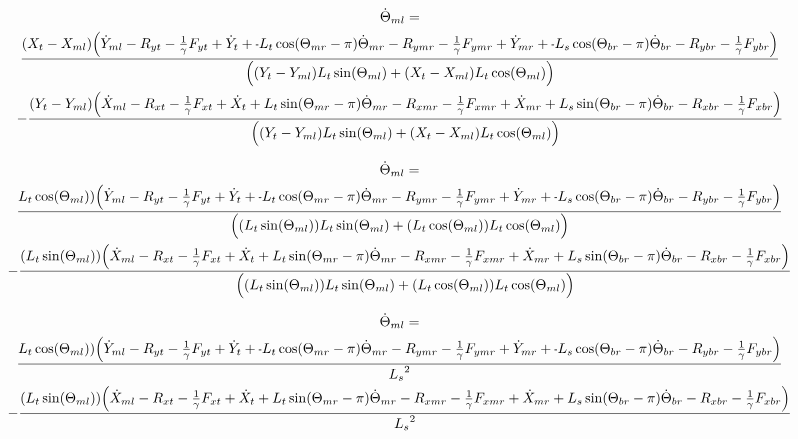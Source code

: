\documentclass[11pt, landscape]{article}
\newcommand{\mn}{\scalebox{0.7}[1.0]{-}}
\begin{document}
\begin{multline}
\dot{\Theta}_{ml} = \\
\frac{(X_{t } - X_{ml}) \Big( \dot{Y}_{ml} - R_{yt} - \frac{1}{\gamma}F_{yt } + \dot{Y}_{t } + \mn L_{t}\cos(\Theta_{mr}-\pi)  \dot{\Theta}_{mr}
- R_{ymr} - \frac{1}{\gamma}F_{ymr} + \dot{Y}_{mr} + \mn L_{s}\cos(\Theta_{br}-\pi)  \dot{\Theta}_{br} - R_{ybr} - \frac{1}{\gamma}F_{ybr}\Big)}
{\Big((Y_{t } - Y_{ml})L_{t}\sin(\Theta_{ml}) + (X_{t } - X_{ml})L_{t}\cos(\Theta_{ml}) \Big)} \\
- \frac{(Y_{t } - Y_{ml})\Big( \dot{X}_{ml} - R_{xt } - \frac{1}{\gamma}F_{xt } + \dot{X}_{t } + L_{t}\sin(\Theta_{mr}-\pi)  \dot{\Theta}_{mr}
- R_{xmr} - \frac{1}{\gamma}F_{xmr} + \dot{X}_{mr} + L_{s}\sin(\Theta_{br}-\pi)  \dot{\Theta}_{br} - R_{xbr} - \frac{1}{\gamma}F_{xbr} \Big)}
{\Big((Y_{t } - Y_{ml})L_{t}\sin(\Theta_{ml}) + (X_{t } - X_{ml})L_{t}\cos(\Theta_{ml}) \Big)}
\end{multline}


\begin{multline}
\dot{\Theta}_{ml} = \\
\frac{L_{t}\cos(\Theta_{ml})) \Big( \dot{Y}_{ml} - R_{yt} - \frac{1}{\gamma}F_{yt } + \dot{Y}_{t } + \mn L_{t}\cos(\Theta_{mr}-\pi)  \dot{\Theta}_{mr}
- R_{ymr} - \frac{1}{\gamma}F_{ymr} + \dot{Y}_{mr} + \mn L_{s}\cos(\Theta_{br}-\pi)  \dot{\Theta}_{br} - R_{ybr} - \frac{1}{\gamma}F_{ybr}\Big)}
{\Big((L_{t}\sin(\Theta_{ml}))L_{t}\sin(\Theta_{ml}) + (L_{t}\cos(\Theta_{ml}))L_{t}\cos(\Theta_{ml}) \Big)} \\
- \frac{(L_{t}\sin(\Theta_{ml}))\Big( \dot{X}_{ml} - R_{xt } - \frac{1}{\gamma}F_{xt } + \dot{X}_{t } + L_{t}\sin(\Theta_{mr}-\pi)  \dot{\Theta}_{mr}
- R_{xmr} - \frac{1}{\gamma}F_{xmr} + \dot{X}_{mr} + L_{s}\sin(\Theta_{br}-\pi)  \dot{\Theta}_{br} - R_{xbr} - \frac{1}{\gamma}F_{xbr} \Big)}
{\Big((L_{t}\sin(\Theta_{ml}))L_{t}\sin(\Theta_{ml}) + (L_{t}\cos(\Theta_{ml}))L_{t}\cos(\Theta_{ml}) \Big)}
\end{multline}

\begin{multline}
\dot{\Theta}_{ml} = \\
\frac{L_{t}\cos(\Theta_{ml})) \Big( \dot{Y}_{ml} - R_{yt} - \frac{1}{\gamma}F_{yt } + \dot{Y}_{t } + \mn L_{t}\cos(\Theta_{mr}-\pi)  \dot{\Theta}_{mr}
- R_{ymr} - \frac{1}{\gamma}F_{ymr} + \dot{Y}_{mr} + \mn L_{s}\cos(\Theta_{br}-\pi)  \dot{\Theta}_{br} - R_{ybr} - \frac{1}{\gamma}F_{ybr}\Big)}
{{L_s}^2} \\
- \frac{(L_{t}\sin(\Theta_{ml}))\Big( \dot{X}_{ml} - R_{xt } - \frac{1}{\gamma}F_{xt } + \dot{X}_{t } + L_{t}\sin(\Theta_{mr}-\pi)  \dot{\Theta}_{mr}
- R_{xmr} - \frac{1}{\gamma}F_{xmr} + \dot{X}_{mr} + L_{s}\sin(\Theta_{br}-\pi)  \dot{\Theta}_{br} - R_{xbr} - \frac{1}{\gamma}F_{xbr} \Big)}
{{L_s}^2}
\end{multline}
\end{document}
